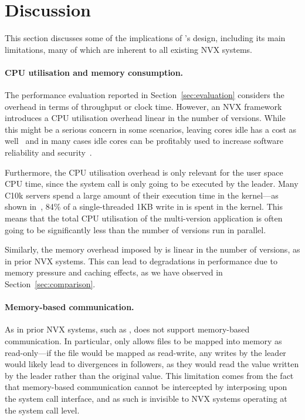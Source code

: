 \section{Discussion}
\label{efficient-execution:discussion}

This section discusses some of the implications of \varan's design, including
its main limitations, many of which are inherent to all existing NVX systems.

\paragraph{CPU utilisation and memory consumption.} The performance evaluation
reported in Section~\ref{sec:evaluation} considers the overhead in terms of
throughput or clock time.  However, an NVX framework introduces a CPU
utilisation overhead linear in the number of versions.  While this might be a
serious concern in some scenarios, leaving cores idle has a cost as
well~\cite{barroso2007} and in many cases idle cores can be profitably used to
increase software reliability and
security~\cite{cox2006,multiplicity,orchestra09,diehard06,mvupdates12,hruby:atc13}.

Furthermore, the CPU utilisation overhead is only relevant for the user space
CPU time, since the system call is only going to be executed by the leader.
Many C10k servers spend a large amount of their execution time in the
kernel---\eg as shown in~\cite{redisoverhead}, 84\% of a single-threaded 1KB
write in \redis is spent in the kernel. This means that the total CPU
utilisation of the multi-version application is often going to be significantly
less than the number of versions run in parallel.

Similarly, the memory overhead imposed by \varan is linear in the number of
versions, as in prior NVX systems.  This can lead to degradations in
performance due to memory pressure and caching effects, as we have observed in
Section~\ref{sec:comparison}.

\paragraph{Memory-based communication.} As in prior NVX systems, such as \mx,
\varan does not support memory-based communication.  In particular, \varan only
allows files to be mapped into memory as read-only---if the file would be
mapped as read-write, any writes by the leader would likely lead to divergences
in followers, as they would read the value written by the leader rather than
the original value.  This limitation comes from the fact that memory-based
communication cannot be intercepted by interposing upon the system call
interface, and as such is invisible to NVX systems operating at the system call
level.

